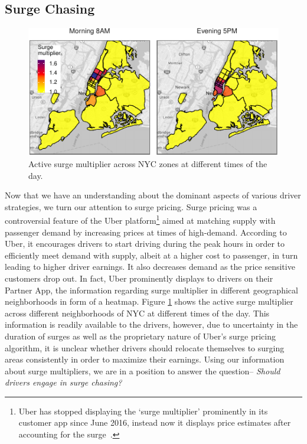 \subsection{Surge Chasing}
\begin{figure}
	\centering
	\includegraphics{figures/surge_heatmap.pdf}
	\caption{Active surge multiplier across NYC zones at different times of the day.}
	\label{fig:surge_heatmap}
\end{figure}
Now that we have an understanding about the dominant aspects of various driver strategies, we turn our attention to surge pricing. Surge pricing was a controversial feature of the Uber platform\footnote{Uber has stopped displaying the `surge multiplier' prominently in its customer app since June 2016, instead now it displays price estimates after accounting for the surge~\cite{surge}.} aimed at matching supply with passenger demand by increasing prices at times of high-demand. According to Uber, it encourages drivers to start driving during the peak hours in order to efficiently meet demand with supply, albeit at a higher cost to passenger, in turn leading to higher driver earnings. It also decreases demand as the price sensitive customers drop out. In fact, Uber prominently displays to drivers on their Partner App, the information regarding surge multiplier in different geographical neighborhoods in form of a heatmap. Figure \ref{fig:surge_heatmap} shows the active surge multiplier across different neighborhoods of NYC at different times of the day. This information is readily available to the drivers, however, due to uncertainty in the duration of surges as well as the proprietary nature of Uber's surge pricing algorithm, it is unclear whether drivers should relocate themselves to surging areas consistently in order to maximize their earnings. Using our information about surge multipliers, we are in a position to answer the question-- \textit{Should drivers engage in surge chasing?}
